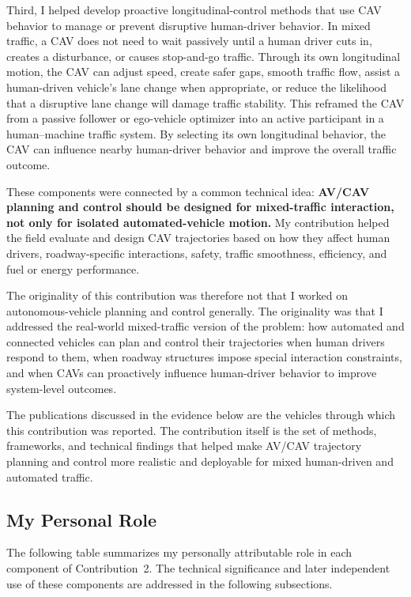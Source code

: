 \documentclass[11pt,letterpaper]{article}
\begin{document}
Third, I helped develop proactive longitudinal-control methods that use CAV behavior to manage or prevent disruptive human-driver behavior. In mixed traffic, a CAV does not need to wait passively until a human driver cuts in, creates a disturbance, or causes stop-and-go traffic. Through its own longitudinal motion, the CAV can adjust speed, create safer gaps, smooth traffic flow, assist a human-driven vehicle's lane change when appropriate, or reduce the likelihood that a disruptive lane change will damage traffic stability. This reframed the CAV from a passive follower or ego-vehicle optimizer into an active participant in a human--machine traffic system. By selecting its own longitudinal behavior, the CAV can influence nearby human-driver behavior and improve the overall traffic outcome.

These components were connected by a common technical idea: \textbf{AV/CAV planning and control should be designed for mixed-traffic interaction, not only for isolated automated-vehicle motion.} My contribution helped the field evaluate and design CAV trajectories based on how they affect human drivers, roadway-specific interactions, safety, traffic smoothness, efficiency, and fuel or energy performance.

The originality of this contribution was therefore not that I worked on autonomous-vehicle planning and control generally. The originality was that I addressed the real-world mixed-traffic version of the problem: how automated and connected vehicles can plan and control their trajectories when human drivers respond to them, when roadway structures impose special interaction constraints, and when CAVs can proactively influence human-driver behavior to improve system-level outcomes.

The publications discussed in the evidence below are the vehicles through which this contribution was reported. The contribution itself is the set of methods, frameworks, and technical findings that helped make AV/CAV trajectory planning and control more realistic and deployable for mixed human-driven and automated traffic.

\subsection{My Personal Role}

The following table summarizes my personally attributable role in each component of Contribution~2. The technical significance and later independent use of these components are addressed in the following subsections.
\end{document}
